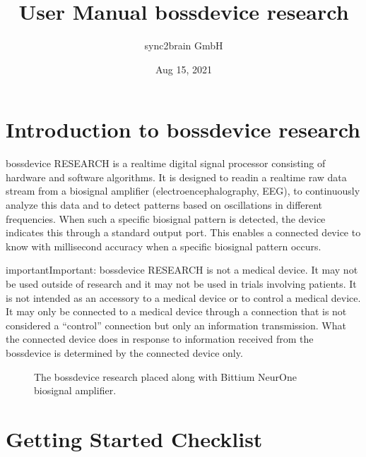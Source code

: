 \documentclass[letterpaper,10pt,english]{sphinxmanual}
\title{User Manual \sphinxhyphen{} bossdevice research}
\date{Aug 15, 2021}
\author{sync2brain GmbH}
\begin{document}
\pagestyle{empty}
\sphinxmaketitle
\pagestyle{plain}
\sphinxtableofcontents
\pagestyle{normal}
\label{\detokenize{index::doc}}



\chapter{Introduction to bossdevice research}
\label{\detokenize{1_introduction_to_bossdevice_research:introduction-to-bossdevice-research}}\label{\detokenize{1_introduction_to_bossdevice_research::doc}}
\sphinxAtStartPar
bossdevice RESEARCH is a real\sphinxhyphen{}time digital signal processor consisting of hardware and software algorithms. It is designed to read\sphinxhyphen{}in a real\sphinxhyphen{}time raw data stream from a biosignal amplifier (electroencephalography, EEG), to continuously analyze this data and to detect patterns based on oscillations in different frequencies. When such a specific bio\sphinxhyphen{}signal pattern is detected, the device indicates this through a standard output port. This enables a connected device to know with millisecond accuracy when a specific bio\sphinxhyphen{}signal pattern occurs.

\begin{sphinxadmonition}{important}{Important:}
\sphinxAtStartPar
bossdevice RESEARCH is not a medical device. It may not be used outside of research
and it may not be used in trials involving patients. It is not intended as an accessory
to a medical device or to control a medical device. It may only be connected to a
medical device through a connection that is not considered a “control” connection
but only an information transmission. What the connected device does in response
to information received from the bossdevice is determined by the connected device
only.
\end{sphinxadmonition}

\begin{figure}[htbp]
\centering
\capstart

\noindent{}
\caption{The bossdevice research placed along with Bittium NeurOne biosignal amplifier.}\label{\detokenize{1_introduction_to_bossdevice_research:id1}}\end{figure}


\chapter{Getting Started \sphinxhyphen{} Checklist}
\label{\detokenize{1b_GettingStartedCheckList:getting-started-checklist}}\label{\detokenize{1b_GettingStartedCheckList::doc}}
\end{document}
